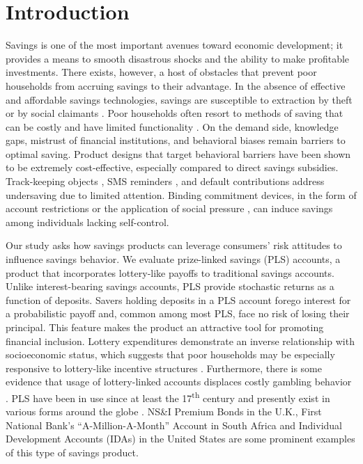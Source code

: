 \documentclass[11pt]{article}
\begin{document}
\newpage

\section{Introduction}

	Savings is one of the most important avenues toward economic development; it provides a means to smooth disastrous shocks and the ability to make profitable investments. There exists, however, a host of obstacles that prevent poor households from accruing savings to their advantage. In the absence of effective and affordable savings technologies, savings are susceptible to extraction by theft or by social claimants . Poor households often resort to methods of saving that can be costly and have limited functionality . On the demand side, knowledge gaps, mistrust of financial institutions, and behavioral biases remain barriers to optimal saving. Product designs that target behavioral barriers have been shown to be extremely cost-effective, especially compared to direct savings subsidies. Track-keeping objects , SMS reminders , and default contributions  address undersaving due to limited attention. Binding commitment devices, in the form of account restrictions  or the application of social pressure , can induce savings among individuals lacking self-control.

	Our study asks how savings products can leverage consumers' risk attitudes to influence savings behavior. We evaluate prize-linked savings (PLS) accounts, a product that incorporates lottery-like payoffs to traditional savings accounts. Unlike interest-bearing savings accounts, PLS provide stochastic returns as a function of deposits. Savers holding deposits in a PLS account forego interest for a probabilistic payoff and, common among most PLS, face no risk of losing their principal. This feature makes the product an attractive tool for promoting financial inclusion. Lottery expenditures demonstrate an inverse relationship with socioeconomic status, which suggests that poor households may be especially responsive to lottery-like incentive structures . Furthermore, there is some evidence that usage of lottery-linked accounts displaces costly gambling behavior . PLS have been in use since at least the 17\textsuperscript{th} century and presently exist in various forms around the globe . NS\&I Premium Bonds in the U.K., First National Bank's ``A-Million-A-Month'' Account in South Africa and Individual Development Accounts (IDAs) in the United States are some prominent examples of this type of savings product.
\end{document}
